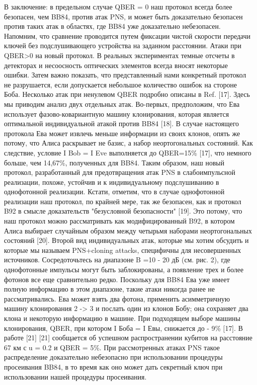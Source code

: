 В заключение: в предельном случае QBER = 0 наш протокол всегда более безопасен, чем BB84, против атак PNS, и может быть доказательно безопасен против таких атак в областях, где BB84 уже доказательно небезопасен. Напомним, что сравнение проводится путем фиксации чистой скорости передачи ключей без подслушивающего устройства на заданном расстоянии.
Атаки при QBER>0 на новый протокол. В реальных экспериментах темные отсчеты в детекторах и несоосность оптических элементов всегда вносят некоторые ошибки.
Затем важно показать, что представленный нами конкретный протокол не разрушается, если допускается небольшое количество ошибок на стороне Боба. Несколько атак при ненулевом QBER подробно описаны в Ref. [17]. Здесь мы приводим анализ двух отдельных атак.
Во-первых, предположим, что Ева использует фазово-ковариантную машину клонирования, которая является оптимальной индивидуальной атакой против BB84 [18]. В случае настоящего протокола Ева может извлечь меньше информации из своих клонов, опять же потому, что Алиса раскрывает не базис, а набор неортогональных состояний. Как следствие, условие I Bob = I Eve выполняется до QBER=15\% [17], что немного больше, чем 14,67\%, полученных для BB84. Таким образом, наш новый протокол, разработанный для предотвращения атак PNS в слабоимпульсной реализации, похоже, устойчив и к индивидуальному подслушиванию в однофотонной реализации. Кстати, отметим, что в случае однофотонной реализации наш протокол, по крайней мере, так же безопасен, как и протокол B92 в смысле доказательств "безусловной безопасности" [19]. Это потому, что наш протокол можно рассматривать как модифицированный B92, в котором Алиса выбирает случайным образом между четырьмя наборами неортогональных состояний [20].
Второй вид индивидуальных атак, которые мы хотим обсудить и которые мы называем PNS+cloning attacks, специфичны для несовершенных источников. Сосредоточьтесь на диапазоне B =10 - 20 дБ (см. рис. 2), где однофотонные импульсы могут быть заблокированы, а появление трех и более фотонов все еще сравнительно редко. Поскольку для BB84 Ева уже имеет полную информацию в этом диапазоне, такие атаки никогда ранее не рассматривались. Ева может взять два фотона, применить асимметричную машину клонирования 2 -> 3 и послать один из клонов Бобу; она сохраняет два клона и некоторую информацию в машине. При подходящем выборе машины клонирования, QBER, при котором I Боба = I Евы, снижается до - 9\% [17]. В работе [21] [21] сообщается об успешном распространении кубитов на расстояние 67 км с u = 0.2 и QBER = 5\%. При рассмотренных атаках PNS такое распределение доказательно небезопасно при использовании процедуры просеивания BB84, в то время как оно может дать секретный ключ при использовании нашей процедуры просеивания.


